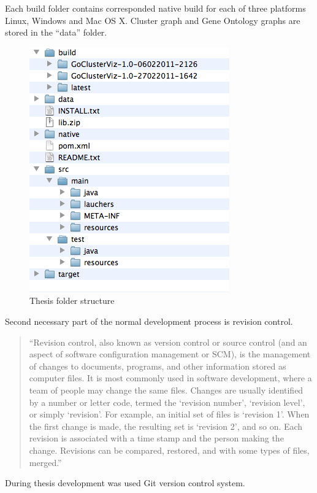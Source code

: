 Each build folder contains corresponded native build for each of three platforms Linux, Windows and Mac OS X. Cluster graph and Gene Ontology graphs are stored in the ``data'' folder.

\begin{figure}[h!]
\centering
\includegraphics[scale=0.6]{pictures/thesis_folder_structure.png}
\caption{Thesis folder structure}
\label{fig:THESIS_FOLDER_STRUCTURE}
\end{figure}

Second necessary part of the normal development process is revision control.

\begin{quotation}
``Revision control, also known as version control or source control (and an aspect of software configuration management or SCM),
is the management of changes to documents, programs, and other information stored as computer files.
It is most commonly used in software development, where a team of people may change the same files.
Changes are usually identified by a number or letter code, termed the `revision number', `revision level', or simply `revision'.
For example, an initial set of files is `revision 1'. When the first change is made, the resulting set is `revision 2', and so on.
Each revision is associated with a time stamp and the person making the change. Revisions can be compared,
restored, and with some types of files, merged.''~\cite{REVISION_CONTROL}
\end{quotation}

During thesis development was used Git version control system.

